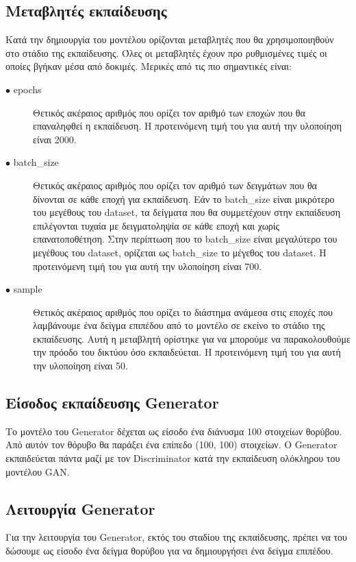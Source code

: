 \subsection{Μεταβλητές εκπαίδευσης}
Κατά την δημιουργία του μοντέλου ορίζονται μεταβλητές που θα χρησιμοποιηθούν στο στάδιο της εκπαίδευσης. Όλες οι μεταβλητές έχουν προ ρυθμισμένες τιμές οι οποίες βγήκαν μέσα από δοκιμές. Μερικές από τις πιο σημαντικές είναι:


\begin{description}
\item[$\bullet$ epochs] Θετικός ακέραιος αριθμός που ορίζει τον αριθμό των εποχών που θα επαναληφθεί η εκπαίδευση. Η προτεινόμενη τιμή του για αυτή την υλοποίηση είναι 2000.
\item[$\bullet$ batch\_size] Θετικός ακέραιος αριθμός που ορίζει τον αριθμό των δειγμάτων που θα δίνονται σε κάθε εποχή για εκπαίδευση. Εάν το batch\_size είναι μικρότερο του μεγέθους του dataset, τα δείγματα που θα συμμετέχουν στην εκπαίδευση επιλέγονται τυχαία με δειγματοληψία σε κάθε εποχή και χωρίς επανατοποθέτηση. Στην περίπτωση που το batch\_size είναι μεγαλύτερο του μεγέθους του dataset, ορίζεται ως batch\_size το μέγεθος του dataset. Η προτεινόμενη τιμή του για αυτή την υλοποίηση είναι 700.
\item[$\bullet$ sample] Θετικός ακέραιος αριθμός που ορίζει το διάστημα ανάμεσα στις εποχές που λαμβάνουμε ένα δείγμα επιπέδου από το μοντέλο σε εκείνο το στάδιο της εκπαίδευσης. Αυτή η μεταβλητή ορίστηκε για να μπορούμε να παρακολουθούμε την πρόοδο του δικτύου όσο εκπαιδεύεται. Η προτεινόμενη τιμή του για αυτή την υλοποίηση είναι 50.
\end{description}

\subsection{Είσοδος εκπαίδευσης Generator}
Το μοντέλο του Generator δέχεται ως είσοδο ένα διάνυσμα 100 στοιχείων θορύβου. Από αυτόν τον θόρυβο θα παράξει ένα επίπεδο (100, 100) στοιχείων. O Generator εκπαιδεύεται πάντα μαζί με τον Discriminator κατά την εκπαίδευση ολόκληρου του μοντέλου GAN.

\subsection{Λειτουργία Generator}
Για την λειτουργία του Generator, εκτός του σταδίου της εκπαίδευσης, πρέπει να του δώσουμε ως είσοδο ένα δείγμα θορύβου για να δημιουργήσει ένα δείγμα επιπέδου.

